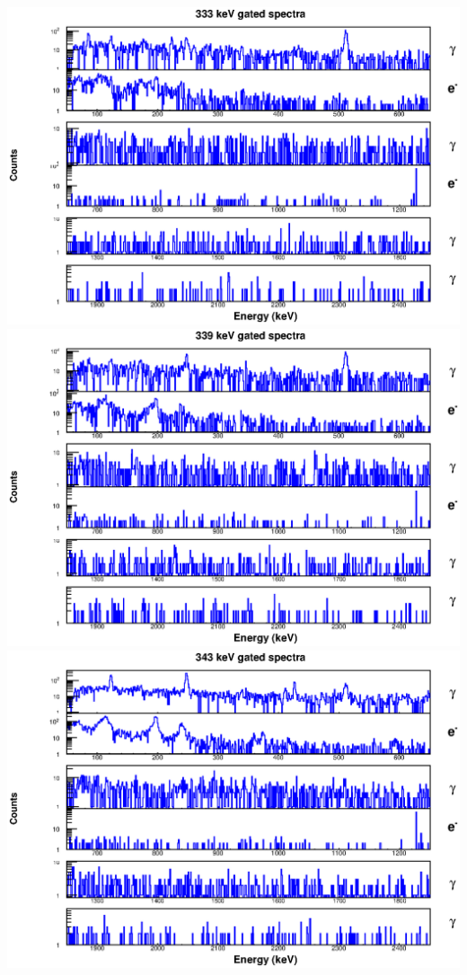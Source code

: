 \begin{landscape}
\includegraphics[scale=1.1]{154Gd_Appendix/333_combined.eps}
\includegraphics[scale=1.1]{154Gd_Appendix/339_combined.eps}
\includegraphics[scale=1.1]{154Gd_Appendix/343_combined.eps}

\end{landscape}
